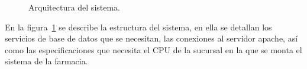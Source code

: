 \begin{figure}[htbp!]
	\begin{center}
		\caption{Arquitectura del sistema.}
		\label{fig:arquitectura}
	\end{center}
\end{figure}

En la figura~\ref{fig:arquitectura} se describe la estructura del sistema, en ella se detallan los servicios de base de datos que se necesitan, las conexiones al servidor apache, así como las especificaciones que necesita el CPU de la sucursal en la que se monta el sistema de la farmacia.
